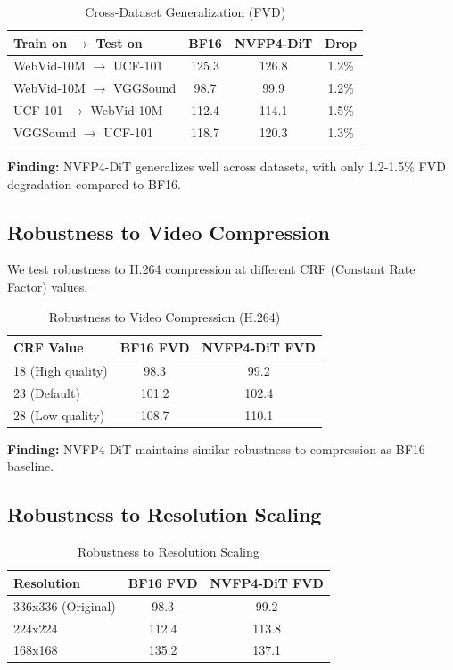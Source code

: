 \documentclass[journal]{IEEEtran}
\theoremstyle{definition}
\theoremstyle{remark}
\begin{document}
\begin{table}[!ht]
\centering
\caption{Cross-Dataset Generalization (FVD)}
\label{tab:cross_dataset}
\begin{tabular}{lccc}
\toprule
Train on $\rightarrow$ Test on & BF16 & NVFP4-DiT & Drop \\
\midrule
WebVid-10M $\rightarrow$ UCF-101 & 125.3 & 126.8 & 1.2\% \\
WebVid-10M $\rightarrow$ VGGSound & 98.7 & 99.9 & 1.2\% \\
UCF-101 $\rightarrow$ WebVid-10M & 112.4 & 114.1 & 1.5\% \\
VGGSound $\rightarrow$ UCF-101 & 118.7 & 120.3 & 1.3\% \\
\bottomrule
\end{tabular}
\end{table}

\textbf{Finding:} NVFP4-DiT generalizes well across datasets, with only 1.2-1.5\% FVD degradation compared to BF16.

\subsection{Robustness to Video Compression}

We test robustness to H.264 compression at different CRF (Constant Rate Factor) values.

\begin{table}[!ht]
\centering
\caption{Robustness to Video Compression (H.264)}
\label{tab:compression}
\begin{tabular}{lcc}
\toprule
CRF Value & BF16 FVD & NVFP4-DiT FVD \\
\midrule
18 (High quality) & 98.3 & 99.2 \\
23 (Default) & 101.2 & 102.4 \\
28 (Low quality) & 108.7 & 110.1 \\
\bottomrule
\end{tabular}
\end{table}

\textbf{Finding:} NVFP4-DiT maintains similar robustness to compression as BF16 baseline.

\subsection{Robustness to Resolution Scaling}

\begin{table}[!ht]
\centering
\caption{Robustness to Resolution Scaling}
\label{tab:resolution}
\begin{tabular}{lcc}
\toprule
Resolution & BF16 FVD & NVFP4-DiT FVD \\
\midrule
336x336 (Original) & 98.3 & 99.2 \\
224x224 & 112.4 & 113.8 \\
168x168 & 135.2 & 137.1 \\
\bottomrule
\end{tabular}
\end{table}
\end{document}
